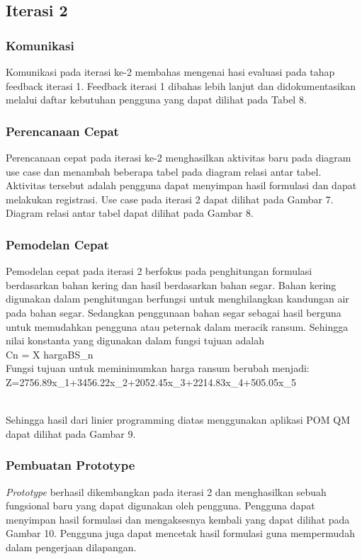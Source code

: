 \subsection*{Iterasi 2}
\subsubsection*{Komunikasi}
Komunikasi pada iterasi ke-2 membahas mengenai hasi evaluasi pada tahap feedback iterasi 1. Feedback iterasi 1 dibahas lebih lanjut dan didokumentasikan melalui daftar kebutuhan pengguna yang dapat dilihat pada Tabel 8.

\subsubsection*{Perencanaan Cepat} 
Perencanaan cepat pada iterasi ke-2 menghasilkan aktivitas baru pada diagram use case dan menambah beberapa tabel pada diagram relasi antar tabel. Aktivitas tersebut adalah pengguna dapat menyimpan hasil formulasi dan dapat melakukan registrasi. Use case pada iterasi 2 dapat dilihat pada Gambar 7. Diagram relasi antar tabel dapat dilihat pada Gambar 8.

\subsubsection*{Pemodelan Cepat}
Pemodelan cepat pada iterasi 2 berfokus pada penghitungan formulasi berdasarkan bahan kering dan hasil berdasarkan bahan segar. Bahan kering digunakan dalam penghitungan berfungsi untuk menghilangkan kandungan air pada bahan segar. Sedangkan penggunaan bahan segar sebagai hasil berguna untuk memudahkan pengguna atau peternak dalam meracik ransum. Sehingga nilai konstanta yang digunakan dalam fungsi tujuan adalah
\\
Cn =  X hargaBS_{n}\\

Fungsi tujuan untuk meminimumkan harga ransum berubah menjadi:\\

Z=2756.89x_1+3456.22x_2+2052.45x_3+2214.83x_4+505.05x_5

\\
Sehingga hasil dari linier programming diatas menggunakan aplikasi POM QM dapat dilihat pada Gambar 9.

\subsubsection*{Pembuatan Prototype}
\textit{Prototype }berhasil dikembangkan pada iterasi 2 dan menghasilkan sebuah fungsional baru yang dapat digunakan oleh pengguna. Pengguna dapat menyimpan hasil formulasi dan mengaksesnya kembali yang dapat dilihat pada Gambar 10. Pengguna juga dapat mencetak hasil formulasi guna mempermudah dalam pengerjaan dilapangan.

